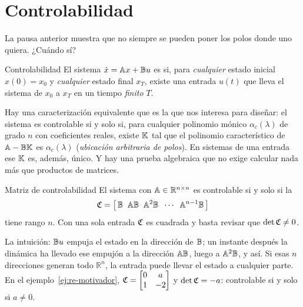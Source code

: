 \section{Controlabilidad}
\label{sec:re-controlabilidad}

La pausa anterior muestra que no siempre se pueden poner los polos donde uno quiera. ¿Cuándo sí?

\begin{definicion}[label=def:re-controlable]{Controlabilidad}
El sistema $\dot x=\mathbb{A} x+\mathbb{B} u$ es  si, para \emph{cualquier} estado inicial $x(0)=x_0$ y \emph{cualquier} estado final $x_T$, existe una entrada $u(t)$ que lleva el sistema de $x_0$ a $x_T$ en un tiempo \emph{finito} $T$.
\end{definicion}

Hay una caracterización equivalente que es la que nos interesa para diseñar: el sistema es controlable si y solo si, para cualquier polinomio mónico $\alpha_c(\lambda)$ de grado $n$ con coeficientes reales, existe $\mathbb{K}$ tal que el polinomio característico de $\mathbb{A}-\mathbb{B}\mathbb{K}$ es $\alpha_c(\lambda)$ (\emph{ubicación arbitraria de polos}). En sistemas de una entrada ese $\mathbb{K}$ es, además, único. Y hay una prueba algebraica que no exige calcular nada más que productos de matrices.

\begin{definicion}[label=def:re-ctrb]{Matriz de controlabilidad}
El sistema con $\mathbb{A}\in\mathbb{R}^{n\times n}$ es controlable si y solo si la 
\begin{equation}
  \mathfrak{C}=\bigl[\,\mathbb{B}\;\;\mathbb{A}\mathbb{B}\;\;\mathbb{A}^2\mathbb{B}\;\;\cdots\;\;\mathbb{A}^{n-1}\mathbb{B}\,\bigr]
  \label{eq:re-ctrb}
\end{equation}
tiene rango $n$. Con una sola entrada $\mathfrak{C}$ es cuadrada y basta revisar que $\det\mathfrak{C}\neq0$.
\end{definicion}

La intuición: $\mathbb{B} u$ empuja el estado en la dirección de $\mathbb{B}$; un instante después la dinámica ha llevado ese empujón a la dirección $\mathbb{A}\mathbb{B}$, luego a $\mathbb{A}^2\mathbb{B}$, y así. Si esas $n$ direcciones generan todo $\mathbb{R}^n$, la entrada puede llevar el estado a cualquier parte. En el ejemplo~\ref{ej:re-motivador}, $\mathfrak{C}=\begin{bmatrix}0&a\\1&-2\end{bmatrix}$ y $\det\mathfrak{C}=-a$: controlable si y solo si $a\neq0$.

